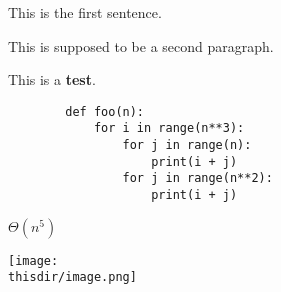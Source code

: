 
\begin{prob}
    This is the first sentence.

    This is supposed to be a second paragraph.

    This is a \textbf{test}.

    \begin{verbatim}
        def foo(n):
            for i in range(n**3):
                for j in range(n):
                    print(i + j)
                for j in range(n**2):
                    print(i + j)
    \end{verbatim}

    \begin{soln}
        $\Theta(n^5)$

        \texttt{[image: \\thisdir/image.png]}
    \end{soln}

\end{prob}
